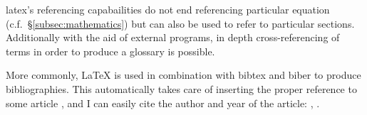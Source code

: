 \documentclass[a4paper,twoside,11pt,final]{article}
\begin{document}
\Gls{latex}'s referencing capabailities do not end referencing particular equation
(c.f.~\S\ref{subsec:mathematics}) but can also be used to refer to particular
sections.  Additionally with the aid of external programs, in depth
cross-referencing of terms in order to produce a \gls{glossary} is possible.

More commonly, LaTeX is used in combination with \gls{bibtex} and \gls{biber} to
produce bibliographies.  This automatically takes care of inserting the proper
reference to some article \cite{Smith2013}, and I can easily cite the author and
year of the article: \citeauthor{Smith2013}, \citeyear{Smith2013}.



\clearpage
\pagestyle{empty}

\printglossaries


\clearpage
\pagestyle{empty}

\printbibliography
\end{document}
